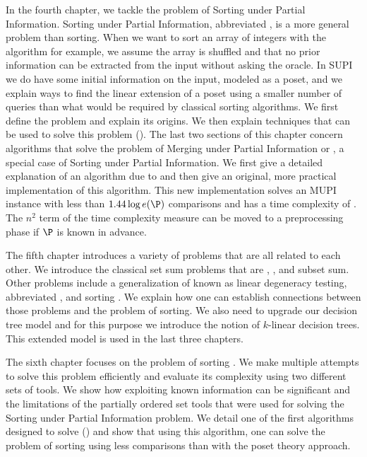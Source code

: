 In the fourth chapter, we tackle the problem of Sorting under Partial
Information. Sorting under Partial Information, abbreviated , is
a more general problem than sorting. When we want to sort an array of integers
with the \quicksort algorithm for example, we assume the array is shuffled and
that no prior information can be extracted from the input without asking the
oracle. In SUPI we do have some initial information on the input, modeled as a
poset, and we explain ways
to find the linear extension of a poset using a smaller number of queries than
what would be required by classical sorting algorithms. We first define
the problem and explain its origins. We then explain techniques that can
be used to solve this problem (\cite{kahn:1995,cardinal:2013}). The
last two sections of this chapter concern
algorithms that solve the problem of Merging under Partial Information or
, a special case of Sorting under Partial Information. We first
give a detailed explanation of an algorithm due to \citet*{linial:1984} and
then give an original, more practical implementation of this algorithm. This
new implementation solves an MUPI instance with less than \(1.44 \log e(\P)\)
comparisons and has a time complexity of . The
\(n^2\) term of the time complexity measure can be moved to a preprocessing
phase if \(\P\) is known in advance.

The fifth chapter introduces a variety of problems that are all related to
each other. We introduce the classical set sum problems that are
\threeSUM, \kSUM, and subset sum. Other problems include a generalization of
\kSUM known as linear degeneracy testing, abbreviated \kLDT, and sorting \XY.
We explain how one can establish connections between those problems and the problem
of sorting. We also need to upgrade our decision tree model and for this
purpose we introduce the notion of \(k\)-linear decision trees. This
extended model is used in the last three chapters.

The sixth chapter focuses on the problem of sorting \XY. We make
multiple attempts to solve this problem efficiently and evaluate its complexity
using two different sets of tools. We show how exploiting known information
can be significant and the limitations of the partially ordered set tools that
were used for solving the Sorting under Partial Information problem. We
detail one of the first algorithms designed to solve 
(\cite{fredman:1976}) and
show that using this algorithm, one can solve the problem of sorting \XY
using less comparisons than with the poset theory approach.

